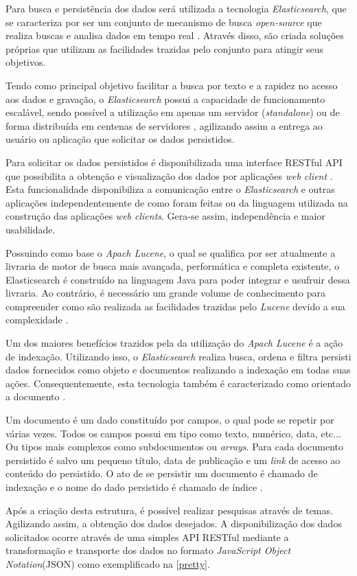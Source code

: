 Para busca e persistência dos dados será utilizada a tecnologia \textit{Elasticsearch}, que se caracteriza por ser um conjunto de mecanismo de busca \textit{open-source} que realiza buscas e analisa dados em tempo real \cite{Gil:2010}. Através disso, são criada soluções próprias que utilizam as  facilidades trazidas pelo conjunto para atingir seus objetivos.

Tendo como principal objetivo facilitar a busca por texto e a rapidez no acesso aos dados e gravação, o \textit{Elasticsearch} possui a capacidade de funcionamento escalável, sendo possível a utilização em apenas um servidor (\textit{standalone}) ou de forma distribuída em centenas de servidores \cite{Gormley:2015}, agilizando assim a entrega ao usuário ou aplicação que solicitar os dados persistidos.

Para solicitar os dados persistidos é disponibilizada uma interface RESTful API que possibilita a obtenção e visualização dos dados por aplicações \textit{web client} \cite{Gormley:2015}. Esta funcionalidade disponibiliza a comunicação entre o \textit{Elasticsearch} e outras aplicações independentemente de como foram feitas ou da linguagem utilizada na construção das aplicações \textit{web clients}. Gera-se assim, independência e maior usabilidade.

Possuindo como base o \textit{Apach Lucene}, o qual se qualifica por ser atualmente a livraria de motor de busca mais avançada, performática e completa  existente, o Elasticsearch é construído na linguagem Java para poder integrar e usufruir dessa livraria. Ao contrário, é necessário um grande volume de conhecimento para compreender como são realizada as facilidades trazidas pelo \textit{Lucene} devido a sua complexidade \cite{Gormley:2015}.

Um dos maiores benefícios trazidos pela da utilização do \textit{Apach Lucene} é a ação de indexação. Utilizando isso, o \textit{Elasticsearch} realiza busca, ordena e filtra persisti dados fornecidos como objeto e documentos realizando a indexação em todas suas ações. Consequentemente, esta tecnologia também é caracterizado como orientado a documento \cite{Gormley:2015}.

Um documento é um dado constituído por campos, o qual pode se repetir por várias vezes. Todos os campos possui em tipo como texto, numérico, data, etc... Ou tipos mais complexos como subdocumentos ou \textit{arrays}. Para cada documento persistido é salvo um pequeno título, data de publicação e um \textit{link} de acesso ao conteúdo do persistido. O ato de se persistir um documento é chamado de indexação e o nome do dado persistido é chamado de índice \cite{Kuc:2013}.

Após a criação desta estrutura, é possível realizar pesquisas através de temas. Agilizando assim, a obtenção dos dados desejados. A disponibilização dos dados solicitados ocorre através de uma simples API RESTful mediante a transformação e transporte dos dados no formato \textit{JavaScript Object Notation}(JSON) como exemplificado na \autoref{pretty}.
